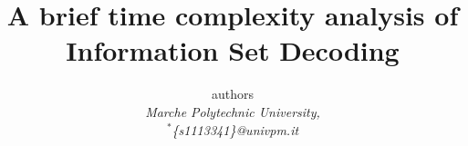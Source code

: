 \title{A brief time complexity analysis of Information Set Decoding}
    \author{authors\\
        \emph{Marche Polytechnic University,}\\
        $^*$\emph{\{s1113341\}@univpm.it}}

\maketitle
